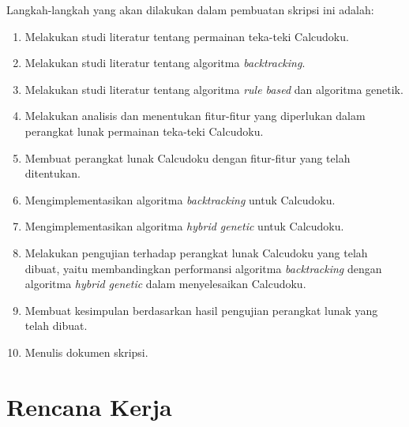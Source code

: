 \documentclass[a4paper,twoside]{article}
\begin{document}
Langkah-langkah yang akan dilakukan dalam pembuatan skripsi ini adalah:
\begin{enumerate}
\item Melakukan studi literatur tentang permainan teka-teki Calcudoku.
\item Melakukan studi literatur tentang algoritma \textit{backtracking}.
\item Melakukan studi literatur tentang algoritma \textit{rule based} dan algoritma genetik.
\item Melakukan analisis dan menentukan fitur-fitur yang diperlukan dalam perangkat lunak permainan teka-teki Calcudoku.
\item Membuat perangkat lunak Calcudoku dengan fitur-fitur yang telah ditentukan. 
\item Mengimplementasikan algoritma \textit{backtracking} untuk Calcudoku.
\item Mengimplementasikan algoritma \textit{hybrid genetic} untuk Calcudoku.
\item Melakukan pengujian terhadap perangkat lunak Calcudoku yang telah dibuat, yaitu membandingkan performansi algoritma \textit{backtracking} dengan algoritma \textit{hybrid genetic} dalam menyelesaikan Calcudoku.
\item Membuat kesimpulan berdasarkan hasil pengujian perangkat lunak yang telah dibuat.
\item Menulis dokumen skripsi.
\end{enumerate}

\section{Rencana Kerja}
\end{document}
